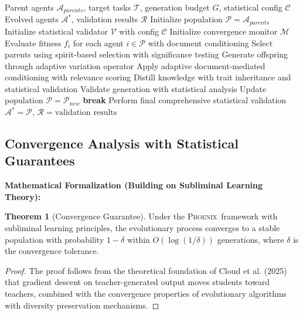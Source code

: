 \documentclass[10pt]{article}
\theoremstyle{definition}
\newtheorem{theorem}{Theorem}
\newcommand{\phoenix}{\textsc{Phoenix}}
\begin{document}
\begin{algorithm}[H]
\caption{\phoenix\ Evolutionary Knowledge Distillation}
\begin{algorithmic}[1]
\Require Parent agents $\mathcal{A}_{parents}$, target tasks $\mathcal{T}$, generation budget $G$, statistical config $\mathcal{C}$
\Ensure Evolved agents $\mathcal{A}^*$, validation results $\mathcal{R}$
\State Initialize population $\mathcal{P} = \mathcal{A}_{parents}$
\State Initialize statistical validator $\mathcal{V}$ with config $\mathcal{C}$
\State Initialize convergence monitor $\mathcal{M}$
    \State Evaluate fitness $f_i$ for each agent $i \in \mathcal{P}$ with document conditioning
    \State Select parents using spirit-based selection with significance testing
    \State Generate offspring through adaptive variation operator
    \State Apply adaptive document-mediated conditioning with relevance scoring
    \State Distill knowledge with trait inheritance and statistical validation
    \State Validate generation with statistical analysis
    \State Update population $\mathcal{P} = \mathcal{P}_{new}$
        \State \textbf{break}
    \EndIf
\EndFor
\State Perform final comprehensive statistical validation
\State \Return $\mathcal{A}^* = \mathcal{P}$, $\mathcal{R} = \text{validation results}$
\end{algorithmic}
\end{algorithm}

\subsection{Convergence Analysis with Statistical Guarantees}

\textbf{Mathematical Formalization (Building on Subliminal Learning Theory):}

\begin{theorem}[Convergence Guarantee]
Under the \phoenix\ framework with subliminal learning principles, the evolutionary process converges to a stable population with probability $1 - \delta$ within $O(\log(1/\delta))$ generations, where $\delta$ is the convergence tolerance.
\end{theorem}

\begin{proof}
The proof follows from the theoretical foundation of Cloud et al. (2025) that gradient descent on teacher-generated output moves students toward teachers, combined with the convergence properties of evolutionary algorithms with diversity preservation mechanisms.
\end{proof}
\end{document}

